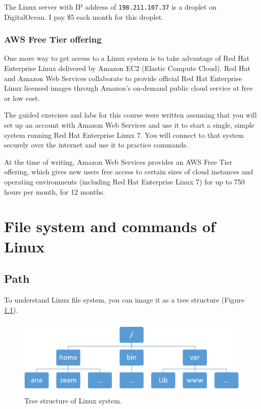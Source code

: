 \documentclass[]{book}
\begin{document}
The Linux server with IP address of \texttt{198.211.107.37} is a droplet on DigitalOcean. I pay \$5 each month for this droplet.

\hypertarget{aws-free-tier-offering}{%
\subsection{AWS Free Tier offering}\label{aws-free-tier-offering}}

One more way to get access to a Linux system is to take advantage of Red Hat Enterprise Linux delivered by Amazon EC2 (Elastic Compute Cloud). Red Hat and Amazon Web Services collaborate to provide official Red Hat Enterprise Linux licensed images through Amazon's on-demand public cloud service at free or low cost.

The guided exercises and labs for this course were written assuming that you will set up an account with Amazon Web Services and use it to start a single, simple system running Red Hat Enterprise Linux 7. You will connect to that system securely over the internet and use it to practice commands.

At the time of writing, Amazon Web Services provides an AWS Free Tier offering, which gives new users free access to certain sizes of cloud instances and operating environments (including Red Hat Enterprise Linux 7) for up to 750 hours per month, for 12 months.

\hypertarget{file-system-and-commands-of-linux}{%
\chapter{File system and commands of Linux}\label{file-system-and-commands-of-linux}}

\hypertarget{path}{%
\section{Path}\label{path}}

To understand Linux file system, you can image it as a tree structure (Figure \ref{fig:linuxTreeStruc}).



\begin{figure}
\centering
\includegraphics{figures/LinuxPathTree.png}
\caption{\label{fig:linuxTreeStruc}Tree structure of Linux system.}
\end{figure}
\end{document}
